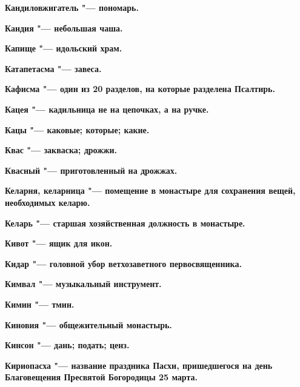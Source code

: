 \bfseries Кандиловжигатель \normalfont{} "--- пономарь. 




\bfseries Кандия \normalfont{} "--- небольшая чаша. 




\bfseries Капище \normalfont{} "--- идольский храм. 




\bfseries Катапетасма \normalfont{} "--- завеса. 




\bfseries Кафисма \normalfont{} "--- один из 20 разделов, на которые разделена Псалтирь. 




\bfseries Кацея \normalfont{} "--- кадильница не на цепочках, а на ручке. 




\bfseries Кацы \normalfont{} "--- каковые; которые; какие. 




\bfseries Квас \normalfont{} "--- закваска; дрожжи. 




\bfseries Квасный \normalfont{} "--- приготовленный на дрожжах. 




\bfseries Келарня, келарница \normalfont{} "--- помещение в монастыре для сохранения вещей, необходимых келарю. 




\bfseries Келарь \normalfont{} "--- старшая хозяйственная должность в монастыре. 




\bfseries Кивот \normalfont{} "--- ящик для икон. 




\bfseries Кидар \normalfont{} "--- головной убор ветхозаветного первосвященника. 




\bfseries Кимвал \normalfont{} "--- музыкальный инструмент. 




\bfseries Кимин \normalfont{} "--- тмин. 




\bfseries Киновия \normalfont{} "--- общежительный монастырь. 




\bfseries Кинсон \normalfont{} "--- дань; подать; ценз. 




\bfseries Кириопасха \normalfont{} "--- название праздника Пасхи, пришедшегося на день Благовещения Пресвятой Богородицы 25 марта. 




